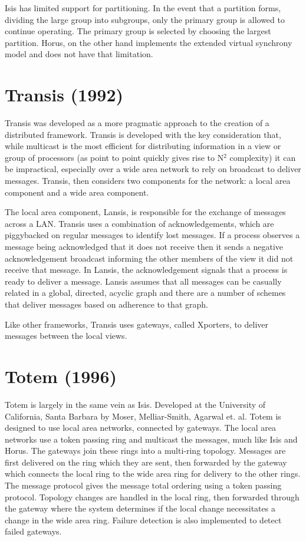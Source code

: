 Isis has limited support for partitioning. In the event that a partition forms, dividing the large group into subgroups, only the primary group is allowed to continue operating. The primary group is selected by choosing the largest partition. Horus, on the other hand implements the extended virtual synchrony model and does not have that limitation.

\section{Transis (1992)}

Transis \cite{TRANSISTOOLKIT} was developed as a more pragmatic approach to the creation of a distributed framework. Transis is developed with the key consideration that, while multicast is the most efficient for distributing information in a view or group of processors (as point to point quickly gives rise to N$^{2}$ complexity) it can be impractical, especially over a wide area network to rely on broadcast to deliver messages. Transis, then considers two components for the network: a local area component and a wide area component.

The local area component, Lansis, is responsible for the exchange of messages across a LAN. Transis uses a combination of acknowledgements, which are piggybacked on regular messages to identify lost messages. If a process observes a message being acknowledged that it does not receive then it sends a negative acknowledgement broadcast informing the other members of the view it did not receive that message. In Lansis, the acknowledgement signals that a process is ready to deliver a message. Lansis assumes that all messages can be casually related in a global, directed, acyclic graph and there are a number of schemes that deliver messages based on adherence to that graph.

Like other frameworks, Transis uses gateways, called Xporters, to deliver messages between the local views. 

\section{Totem (1996)}

Totem\cite{TOTEMTOOLKIT} is largely in the same vein as Isis. Developed at the University of California, Santa Barbara by Moser, Melliar-Smith, Agarwal et. al. Totem is designed to use local area networks, connected by gateways. The local area networks use a token passing ring and multicast the messages, much like Isis and Horus. The gateways join these rings into a multi-ring topology. Messages are first delivered on the ring which they are sent, then forwarded by the gateway which connects the local ring to the wide area ring for delivery to the other rings. The message protocol gives the message total ordering using a token passing protocol. Topology changes are handled in the local ring, then forwarded through the gateway where the system determines if the local change necessitates a change in the wide area ring. Failure detection is also implemented to detect failed gateways.

